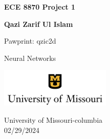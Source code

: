 \begin{titlepage}
    \begin{center}

        \vspace*{1cm}

        \Large
        \textbf{ECE 8870 Project 1}

        \vspace{0.5cm}
        \textbf{Qazi Zarif Ul Islam}

        Pawprint: qzic2d

        \large
        Neural Networks

        \vspace{0.8cm}
        \includegraphics[width=0.4\textwidth]{figs/Screenshot 2023-09-28 011032.png}

        University of Missouri-columbia \\
        02/29/2024
        
    \end{center}
\end{titlepage}